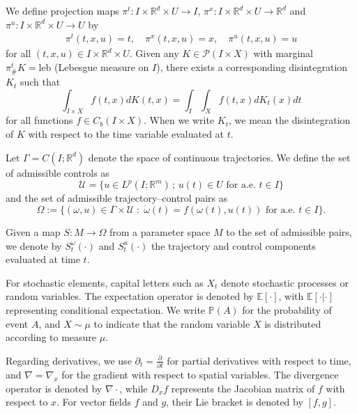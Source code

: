 \documentclass{article}
\begin{document}
We define projection maps
$\pi^t: I \times \mathbb{R}^d \times U \rightarrow I$,
$\pi^x: I \times \mathbb{R}^d \times U \rightarrow \mathbb{R}^d$
and $\pi^u: I \times \mathbb{R}^d \times U \rightarrow U$ by
\begin{align}
    \pi^t(t,x,u) = t, \quad
    \pi^x(t,x,u) = x, \quad
    \pi^u(t,x,u) = u \nonumber
\end{align}
for all $(t,x,u) \in I \times \mathbb{R}^d \times U$. Given any
$K \in \mathcal{P}(I \times X)$ with marginal
$\pi^t_{\#}K = \mathrm{leb}$ (Lebesgue measure on $I$), there
exists a corresponding disintegration $K_t$ such that 
\[ \int_{I \times X} f(t,x)dK(t,x) =
   \int_{I}\int_{X} f(t,x) dK_t(x)dt \]
for all functions $f \in C_b(I \times X)$. When we write $K_t$,
we mean the disintegration of $K$ with respect to the time
variable evaluated at $t$. 


Let $\Gamma = C(I;\mathbb{R}^d)$ denote the space of continuous
trajectories. We define the set of admissible controls as
\[
\mathcal{U} = \{ u \in L^p(I;\mathbb{R}^m) \,;\,
u(t) \in U \text{ for a.e. } t \in I \}
\]
and the set of admissible trajectory–control pairs as
\[
\Omega := \{(\omega, u) \in \Gamma \times \mathcal{U} \;:\;
\dot{\omega}(t) = f(\omega(t), u(t)) \text{ for a.e. } t \in I \}.
\]

Given a map $S: M \rightarrow \Omega$ from a parameter space $M$
to the set of admissible pairs, we denote by $S^\omega_t(\cdot)$
and $S^u_t(\cdot)$ the trajectory and control components evaluated
at time $t$.

For stochastic elements, capital letters such as $X_t$ denote
stochastic processes or random variables. The expectation operator
is denoted by $\mathbb{E}[\cdot]$, with $\mathbb{E}[\cdot | \cdot]$
representing conditional expectation. We write $\mathbb{P}(A)$
for the probability of event $A$, and $X \sim \mu$ to indicate
that the random variable $X$ is distributed according to measure
$\mu$.

Regarding derivatives, we use $\partial_t = \frac{\partial}{\partial t}$
for partial derivatives with respect to time, and
$\nabla = \nabla_x$ for the gradient with respect to spatial
variables. The divergence operator is denoted by $\nabla \cdot$,
while $D_x f$ represents the Jacobian matrix of $f$ with respect
to $x$. For vector fields $f$ and $g$, their Lie bracket is
denoted by $[f,g]$.
\end{document}

